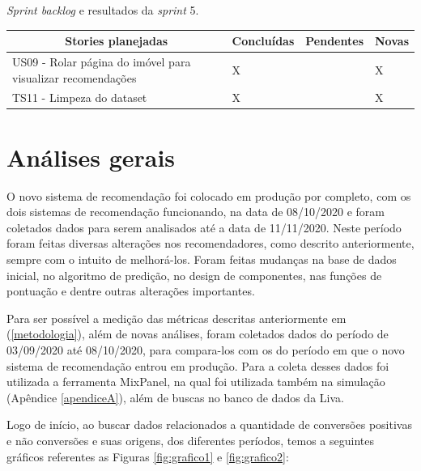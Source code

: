 \begin{quadro}[H]
\centering
\caption[\textit{Sprint backlog} e resultados da \textit{sprint} 5]{\textit{Sprint backlog} e resultados da \textit{sprint} 5.}
\label{quadro:sprint5}
\begin{tabular}{|p{6cm}|p{2cm}|p{2cm}|p{1cm}|}
\hline
\multicolumn{1}{|c|}{\textbf{Stories planejadas}} & \multicolumn{1}{c|}{\textbf{Concluídas}} & \multicolumn{1}{c|}{\textbf{Pendentes}} & \multicolumn{1}{c|}{\textbf{Novas}} \\ \hline
US09 - Rolar página do imóvel para visualizar recomendações & X &  & X \\ \hline
TS11 - Limpeza do dataset & X &  & X \\ \hline
\end{tabular}
\end{quadro}

\section{Análises gerais}
\label{analise_gerais}

O novo sistema de recomendação foi colocado em produção por completo, com os dois sistemas de recomendação funcionando, na data de 08/10/2020 e foram coletados dados para serem analisados até a data de 11/11/2020. Neste período foram feitas diversas alterações nos recomendadores, como descrito anteriormente, sempre com o intuito de melhorá-los. Foram feitas mudanças na base de dados inicial, no algoritmo de predição, no design de componentes, nas funções de pontuação e dentre outras alterações importantes.

Para ser possível a medição das métricas descritas anteriormente em (\ref{metodologia}), além de novas análises, foram coletados dados do período de 03/09/2020 até 08/10/2020, para compara-los com os do período em que o novo sistema de recomendação entrou em produção. Para a coleta desses dados foi utilizada a ferramenta MixPanel, na qual foi utilizada também na simulação (Apêndice \ref{apendiceA}), além de buscas no banco de dados da Liva.

Logo de início, ao buscar dados relacionados a quantidade de conversões positivas e não conversões e suas origens, dos diferentes períodos, temos a seguintes gráficos referentes as Figuras \ref{fig:grafico1} e \ref{fig:grafico2}:

